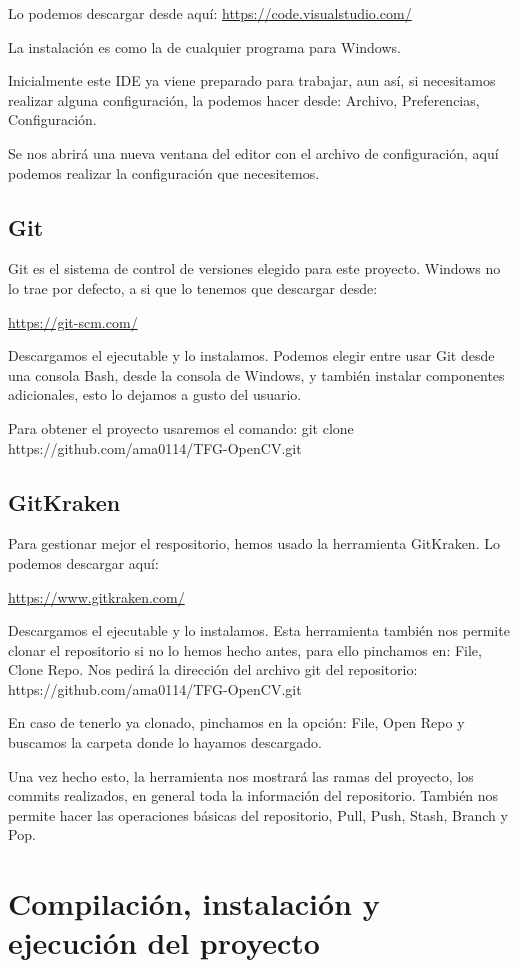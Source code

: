 Lo podemos descargar desde aquí:
\url{https://code.visualstudio.com/}

La instalación es como la de cualquier programa para Windows.

Inicialmente este IDE ya viene preparado para trabajar, aun así, si necesitamos realizar alguna configuración, la podemos hacer desde: Archivo, Preferencias, Configuración.

Se nos abrirá una nueva ventana del editor con el archivo de configuración, aquí podemos realizar la configuración que necesitemos.

\subsection{Git}
Git es el sistema de control de versiones elegido para este proyecto. Windows no lo trae por defecto, a si que lo tenemos que descargar desde:

\url{https://git-scm.com/}

Descargamos el ejecutable y lo instalamos. Podemos elegir entre usar Git desde una consola Bash, desde la consola de Windows, y también instalar componentes adicionales, esto lo dejamos a gusto del usuario.

Para obtener el proyecto usaremos el comando: git clone https://github.com/ama0114/TFG-OpenCV.git

\subsection{GitKraken}
Para gestionar mejor el respositorio, hemos usado la herramienta GitKraken. Lo podemos descargar aquí:

\url{https://www.gitkraken.com/}

Descargamos el ejecutable y lo instalamos. Esta herramienta también nos permite clonar el repositorio si no lo hemos hecho antes, para ello pinchamos en: File, Clone Repo. Nos pedirá la dirección del archivo git del repositorio: https://github.com/ama0114/TFG-OpenCV.git

En caso de tenerlo ya clonado, pinchamos en la opción: File, Open Repo y buscamos la carpeta donde lo hayamos descargado.

Una vez hecho esto, la herramienta nos mostrará las ramas del proyecto, los commits realizados, en general toda la información del repositorio. También nos permite hacer las operaciones básicas del repositorio, Pull, Push, Stash, Branch y Pop.

\section{Compilación, instalación y ejecución del proyecto}

